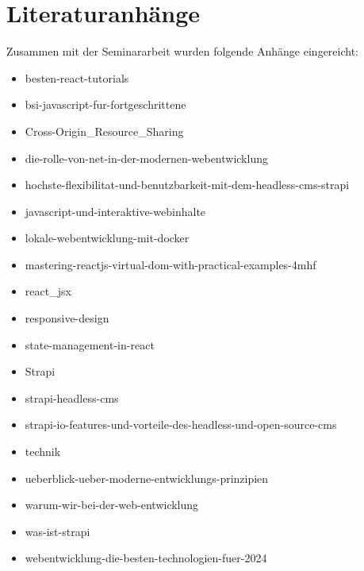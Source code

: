 \section{Literaturanhänge}
Zusammen mit der Seminararbeit wurden folgende Anhänge eingereicht:

\begin{itemize}
    \item besten-react-tutorials
    \item bsi-javascript-fur-fortgeschrittene
    \item Cross-Origin\_Resource\_Sharing
    \item die-rolle-von-net-in-der-modernen-webentwicklung
    \item hochste-flexibilitat-und-benutzbarkeit-mit-dem-headless-cms-strapi
    \item javascript-und-interaktive-webinhalte
    \item lokale-webentwicklung-mit-docker
    \item mastering-reactjs-virtual-dom-with-practical-examples-4mhf
    \item react\_jsx
    \item responsive-design
    \item state-management-in-react
    \item Strapi
    \item strapi-headless-cms
    \item strapi-io-features-und-vorteile-des-headless-und-open-source-cms
    \item technik
    \item ueberblick-ueber-moderne-entwicklungs-prinzipien
    \item warum-wir-bei-der-web-entwicklung
    \item was-ist-strapi
    \item webentwicklung-die-besten-technologien-fuer-2024
\end{itemize}

